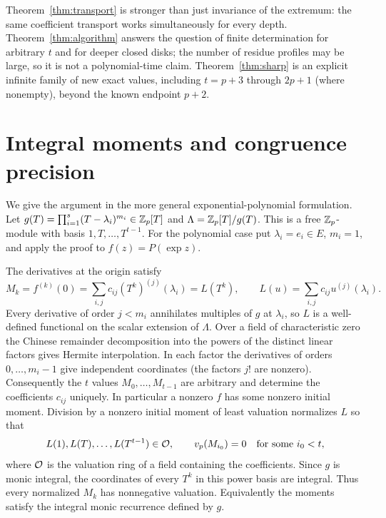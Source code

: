 \documentclass[11pt]{article}
\theoremstyle{remark}\newtheorem{remark}[theorem]{Remark}
\newcommand{\vp}{v_p}\newcommand{\ord}{\operatorname{ord}}\newcommand{\spn}{\operatorname{span}}\newcommand{\res}{\operatorname{res}}
\begin{document}
Theorem~\ref{thm:transport} is stronger than just invariance of the extremum: the
same coefficient transport works simultaneously for every depth. Theorem~\ref{thm:algorithm}
answers the question of finite determination for arbitrary $t$ and for deeper closed
disks; the number of residue profiles may be large, so it is not a polynomial-time
claim. Theorem~\ref{thm:sharp} is an explicit infinite family of new exact values,
including $t=p+3$ through $2p+1$ (where nonempty), beyond the known endpoint $p+2$.

\section{Integral moments and congruence precision}

We give the argument in the more general exponential-polynomial formulation. Let
$g(T)=\prod_{i=1}^s(T-\lambda_i)^{m_i}\in\mathbb Z_p[T]$ and
$\Lambda=\mathbb Z_p[T]/g(T)$. This is a free $\mathbb Z_p$-module with basis $1,T,\ldots,T^{t-1}$.
For the polynomial case put $\lambda_i=e_i\in E$, $m_i=1$, and apply the proof to
$f(z)=P(\exp z)$.

The derivatives at the origin satisfy
\begin{equation}\label{eq:moments}
 M_k=f^{(k)}(0)=\sum_{i,j}c_{ij}(T^k)^{(j)}(\lambda_i)=L(T^k),\qquad
 L(u)=\sum_{i,j}c_{ij}u^{(j)}(\lambda_i).
\end{equation}
Every derivative of order $j<m_i$ annihilates multiples of $g$ at $\lambda_i$, so $L$
is a well-defined functional on the scalar extension of $\Lambda$. Over a field of
characteristic zero the Chinese remainder decomposition into the powers of the distinct
linear factors gives Hermite interpolation. In each factor the derivatives of orders
$0,\ldots,m_i-1$ give independent coordinates (the factors $j!$ are nonzero).
Consequently the $t$ values $M_0,\ldots,M_{t-1}$ are arbitrary and determine the
coefficients $c_{ij}$ uniquely. In particular a nonzero $f$ has some nonzero initial
moment. Division by a nonzero initial moment of least valuation normalizes $L$ so that
\begin{equation}\label{eq:normal}
 L(1),L(T),\ldots,L(T^{t-1})\in\Ocal,
 \qquad \vp(M_{i_0})=0\quad\text{for some }i_0<t,
\end{equation}
where $\mathcal O$ is the valuation ring of a field containing the coefficients. Since $g$
is monic integral, the coordinates of every $T^k$ in this power basis are integral.
Thus every normalized $M_k$ has nonnegative valuation. Equivalently the moments satisfy
the integral monic recurrence defined by $g$.
\end{document}
